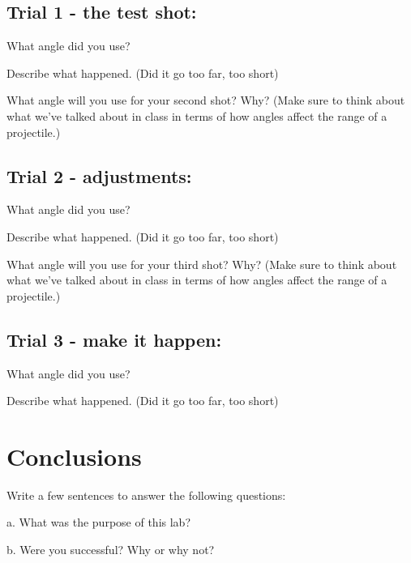 \documentclass[10pt]{exam}
\begin{document}
\subsection*{Trial 1 - the test shot:}

\noindent
What angle did you use?
\vspace{5em}

\noindent
Describe what happened. (Did it go too far, too short)
\vspace{5em}

\noindent
What angle will you use for your second shot?  Why?  (Make sure to think about what we've talked about in class in terms of how angles affect the range of a projectile.)
\vspace{5em}


\subsection*{Trial 2 - adjustments:}
\noindent
What angle did you use?
\vspace{5em}

\noindent
Describe what happened. (Did it go too far, too short)
\vspace{5em}

\noindent
What angle will you use for your third shot?  Why?  (Make sure to think about what we've talked about in class in terms of how angles affect the range of a projectile.)
\vspace{5em}




\subsection*{Trial 3 - make it happen:}

\noindent
What angle did you use?
\vspace{5em}

\noindent
Describe what happened. (Did it go too far, too short)
\vspace{5em}


			
\section*{Conclusions}
Write a few sentences to answer the following questions:

a.	What was the purpose of this lab? 

b.	Were you successful?  Why or why not? 
\end{document}
